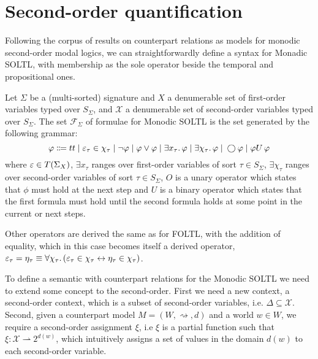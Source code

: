 \section{Second-order quantification}

Following the corpus of results on counterpart relations as models for monodic second-order modal logics, we can
straightforwardly define a syntax for Monadic \ac{SOLTL}, with membership as the sole operator beside the temporal and
propositional ones.

\begin{definition}
Let $\Sigma$ be a (multi-sorted) signature and $X$ a denumerable set of first-order variables typed over $S_\Sigma$, and
$\mathcal{X}$ a denumerable set of second-order variables typed over $S_\Sigma$. The set $\mathcal{F}_\Sigma$ of
formulae for Monodic \ac{SOLTL} is the set generated by the following grammar:
\[
  \varphi \Coloneqq tt \;|\; \varepsilon_\tau \in \chi_\tau
                    \;|\; \neg\varphi
                    \;|\; \varphi \lor \varphi
                    \;|\; \exists {x_\tau} \ldotp {\varphi}
                    \;|\; \exists {\chi_\tau} \ldotp {\varphi}
                    \;|\; \bigcirc{\varphi}
                    \;|\; {\varphi}U\,{\varphi}
\]
where $\varepsilon \in T({\Sigma}_{X})$, $\exists x_\tau$ ranges over first-order variables of sort $\tau \in S_\Sigma$,
$\exists \chi_\tau$ ranges over second-order variables of sort $\tau \in S_\Sigma$,
$O$ is a unary operator which states that $\phi$ must hold at the next step and $U$ is a binary operator which states
that the first formula must hold until the second formula holds at some point in the current or next steps.
\end{definition}

Other operators are derived the same as for \ac{FOLTL}, with the addition of equality, which in
this case becomes itself a derived operator, $\varepsilon_\tau = \eta_\tau \equiv \forall {\chi_\tau} \ldotp {(}\varepsilon_\tau \in
\chi_\tau \leftrightarrow \eta_\tau \in \chi_\tau)$.

To define a semantic with counterpart relations for the Monodic \ac{SOLTL} we need to extend some concept to the
second-order. First we need a new context, a second-order context, which is a subset of second-order variables, i.e.
$\Delta \subseteq \mathcal{X}$. Second, given a counterpart model $M = (W, \rightsquigarrow, d)$ and a world $w \in W$,
we require a second-order assignment $\xi$, i.e $\xi$ is a partial function such that $\xi : \mathcal{X} \rightharpoonup
2^{d(w)}$, which intuitively assigns a set of values in the domain $d(w)$ to each second-order variable.

